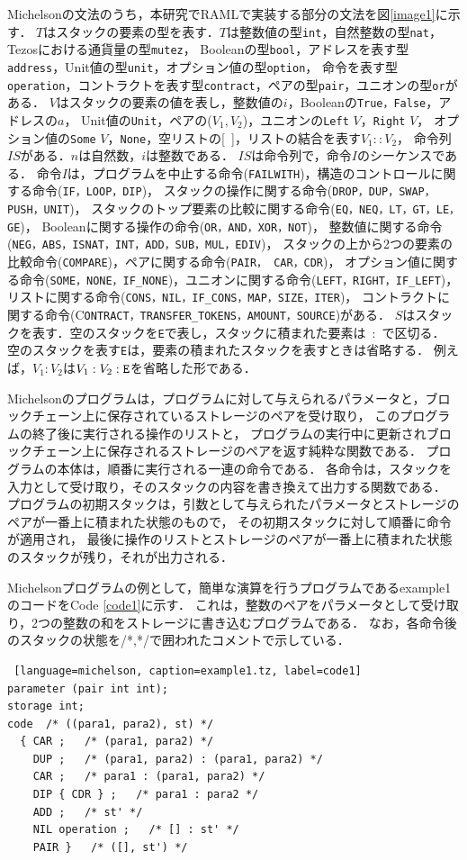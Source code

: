 \documentclass{kuisthesis}
\begin{document}
Michelsonの文法のうち，本研究でRAMLで実装する部分の文法を図\ref{image1}に示す．
$T$はスタックの要素の型を表す．$T$は整数値の型{\tt int}，自然整数の型{\tt nat}，Tezosにおける通貨量の型{\tt mutez}，
Booleanの型{\tt bool}，アドレスを表す型{\tt address}，Unit値の型{\tt unit}，オプション値の型{\tt option}，
命令を表す型{\tt operation}，コントラクトを表す型{\tt contract}，ペアの型{\tt pair}，ユニオンの型{\tt or}がある．
$V$はスタックの要素の値を表し，整数値の$i$，Booleanの{\tt True，False}，アドレスの$a$，
Unit値の{\tt Unit}，ペアの($V_1,V_2$)，ユニオンの{\tt Left} $V$，{\tt Right} $V$，
オプション値の{\tt Some} $V$，{\tt None}，空リストの[\ ]，リストの結合を表す$V_1 :: V_2$，
命令列$IS$がある．$n$は自然数，$i$は整数である．
$IS$は命令列で，命令$I$のシーケンスである．
命令$I$は，プログラムを中止する命令({\tt FAILWITH})，構造のコントロールに関する命令({\tt IF，LOOP，DIP})，
スタックの操作に関する命令({\tt DROP，DUP，SWAP，PUSH，UNIT})，
スタックのトップ要素の比較に関する命令({\tt EQ，NEQ，LT，GT，LE，GE})，
Booleanに関する操作の命令({\tt OR，AND，XOR，NOT})，
整数値に関する命令({\tt NEG，ABS，ISNAT，INT，ADD，SUB，MUL，EDIV})，
スタックの上から2つの要素の比較命令({\tt COMPARE})，ペアに関する命令({\tt PAIR， CAR，CDR})，
オプション値に関する命令({\tt SOME，NONE，IF\_NONE})，ユニオンに関する命令({\tt LEFT，RIGHT，IF\_LEFT})，
リストに関する命令({\tt CONS，NIL，IF\_CONS，MAP，SIZE，ITER})，
コントラクトに関する命令(C{\tt ONTRACT，TRANSFER\_TOKENS，AMOUNT，SOURCE})がある．
$S$はスタックを表す．空のスタックを{\tt E}で表し，スタックに積まれた要素は\ :\ で区切る．
空のスタックを表す{\tt E}は，要素の積まれたスタックを表すときは省略する．
例えば，$V_1 : V_2$は$V_1 : V_2 : {\tt E}$を省略した形である．




Michelsonのプログラムは，プログラムに対して与えられるパラメータと，ブロックチェーン上に保存されているストレージのペアを受け取り，
このプログラムの終了後に実行される操作のリストと，
プログラムの実行中に更新されブロックチェーン上に保存されるストレージのペアを返す純粋な関数である．
プログラムの本体は，順番に実行される一連の命令である．
各命令は，スタックを入力として受け取り，そのスタックの内容を書き換えて出力する関数である．
プログラムの初期スタックは，引数として与えられたパラメータとストレージのペアが一番上に積まれた状態のもので，
その初期スタックに対して順番に命令が適用され，
最後に操作のリストとストレージのペアが一番上に積まれた状態のスタックが残り，それが出力される．

Michelsonプログラムの例として，簡単な演算を行うプログラムであるexample1のコードをCode \ref{code1}に示す．
これは，整数のペアをパラメータとして受け取り，2つの整数の和をストレージに書き込むプログラムである．
なお，各命令後のスタックの状態を/*,*/で囲われたコメントで示している．
\begin{lstlisting} [language=michelson, caption=example1.tz, label=code1]
parameter (pair int int); 
storage int;
code  /* ((para1, para2), st) */
  { CAR ;   /* (para1, para2) */
    DUP ;   /* (para1, para2) : (para1, para2) */
    CAR ;   /* para1 : (para1, para2) */
    DIP { CDR } ;   /* para1 : para2 */
    ADD ;   /* st' */
    NIL operation ;   /* [] : st' */
    PAIR }   /* ([], st') */
\end{lstlisting}
\end{document}
